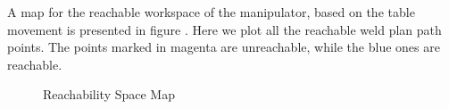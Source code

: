 A map for the reachable workspace of the manipulator, based on the table movement is presented in figure . Here we plot all the reachable weld plan path points. The points marked in magenta are unreachable, while the blue ones are reachable. 
\begin{figure}[!ht] %
	\centering
	\caption{Reachability Space Map}
	\label{fig:rc3}
\end{figure}

